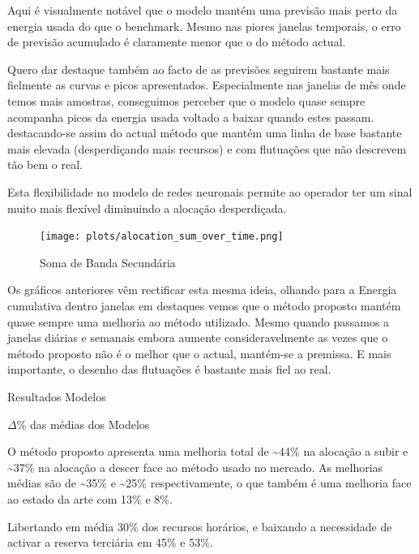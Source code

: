 Aqui é visualmente notável que o modelo mantém uma previsão mais perto da energia usada do que o benchmark. Mesmo nas piores janelas temporais, o erro de previsão acumulado é claramente menor que o do método actual.\par
Quero dar destaque também ao facto de as previsões seguirem bastante mais fielmente as curvas e picos apresentados. Especialmente nas janelas de mês onde temos mais amostras, conseguimos perceber que o modelo quase sempre acompanha picos da energia usada voltado a baixar quando estes passam. destacando-se assim do actual método que mantém uma linha de base bastante mais elevada (desperdiçando mais recursos) e com flutuações que não descrevem tão bem o real.\par
Esta flexibilidade no modelo de redes neuronais permite ao operador ter um sinal muito mais flexível diminuindo a alocação desperdiçada.\par

\begin{figure}[H]
    \centering
    \texttt{[image: plots/alocation\_sum\_over\_time.png]}
    \caption{Soma de Banda Secundária}
    \label{fig:mltimewindowssum}
\end{figure}

Os gráficos anteriores vêm rectificar esta mesma ideia, olhando para a Energia cumulativa dentro janelas em destaques vemos que o método proposto mantém quase sempre uma melhoria ao método utilizado. Mesmo quando passamos a janelas diárias e semanais embora aumente consideravelmente as vezes que o método proposto não é o melhor que o actual, mantém-se a premissa. E mais importante, o desenho das flutuações é bastante mais fiel ao real.\par


\begin{table}[H]
    \caption{Resultados Modelos}    
    \resizebox{\linewidth}{!}{}
    \label{tab:mlres}
    \end{table}



\begin{table}[H]
    \caption{$\Delta$\% das médias dos Modelos}    
    \resizebox{\linewidth}{!}{}
    \label{tab:mlres_deltas}
    \end{table}

O método proposto apresenta uma melhoria total de \textasciitilde44\% na alocação a subir e \textasciitilde37\% na alocação a descer face ao método usado no mercado. As melhorias médias são de \textasciitilde35\% e \textasciitilde25\% respectivamente, o que também é uma melhoria face ao estado da arte \cite{Algarvio2024} com 13\% e 8\%.\par
Libertando em média 30\% dos recursos horários, e baixando a necessidade de activar a reserva terciária em 45\% e 53\%.\par

